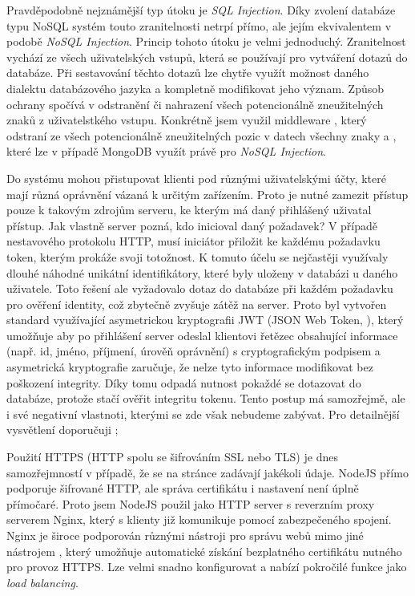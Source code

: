 Pravděpodobně nejznámější typ útoku je \textit{SQL Injection}. Díky zvolení databáze typu NoSQL systém touto zranitelnosti netrpí přímo, ale jejím ekvivalentem v podobě \textit{NoSQL Injection}. Princip tohoto útoku je velmi jednoduchý. Zranitelnost vychází ze všech uživatelských vstupů, která se používají pro vytváření dotazů do databáze. Při sestavování těchto dotazů lze chytře využít možnost daného dialektu databázového jazyka a kompletně modifikovat jeho význam. Způsob ochrany spočívá v odstranění či nahrazení všech potencionálně zneužitelných znaků z uživatelstkého vstupu. Konkrétně jsem využil middleware , který odstraní ze všech potencionálně zneužitelných pozic v datech všechny znaky \uv{\$} a , které lze v případě MongoDB využít právě pro \textit{NoSQL Injection}.

Do systému mohou přistupovat klienti pod různými uživatelskými účty, které mají různá oprávnění vázaná k určitým zařízením. Proto je nutné zamezit přístup pouze k takovým zdrojům serveru, ke kterým má daný přihlášený uživatal přístup. Jak vlastně server pozná, kdo inicioval daný požadavek? V případě nestavového protokolu HTTP, musí iniciátor přiložit ke každému požadavku token, kterým prokáže svoji totožnost. K tomuto účelu se nejčastěji využívaly dlouhé náhodné unikátní identifikátory, které byly uloženy v databázi u daného uživatele. Toto řešení ale vyžadovalo dotaz do databáze při každém požadavku pro ověření identity, což zbytečně zvyšuje zátěž na server. Proto byl vytvořen standard využívající asymetrickou kryptografii JWT (JSON Web Token, \cite[RFC 7519]{rfc-jwt}), který umožňuje aby po přihlášení server odeslal klientovi řetězec obsahující informace (např. id, jméno, příjmení, úrověň oprávnění) s cryptografickým podpisem a asymetrická kryptografie zaručuje, že nelze tyto informace modifikovat bez poškození integrity. Díky tomu odpadá nutnost pokaždé se dotazovat do databáze, protože stačí ověřit integritu tokenu. Tento postup má samozřejmě, ale i své negativní vlastnoti, kterými se zde však nebudeme zabývat. Pro detailnější vysvětlení doporučuji \cite{jwt-cons};

Použití HTTPS (HTTP spolu se šifrováním SSL nebo TLS) je dnes samozřejmností v případě, že se na stránce zadávají jakékoli údaje. NodeJS přímo podporuje šifrované HTTP, ale správa certifikátu i nastavení není úplně přímočaré. Proto jsem NodeJS použil jako HTTP server s reverzním proxy serverem Nginx, který s klienty již komunikuje pomocí zabezpečeného spojení. Nginx je široce podporován různými nástroji pro správu webů mimo jiné nástrojem , který umožňuje automatické získání bezplatného certifikátu nutného pro provoz HTTPS. Lze velmi snadno konfigurovat a nabízí pokročilé funkce jako \textit{load balancing}.

